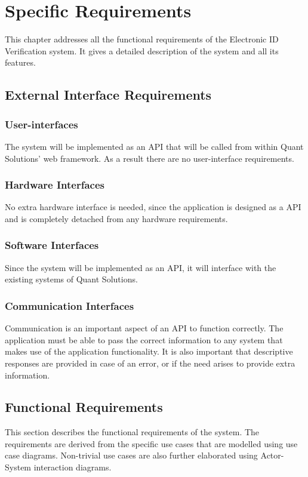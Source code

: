 \documentclass{article}
\def \project{Electronic ID Verification }
\begin{document}
	\cleardoublepage

	\section{Specific Requirements}\label{sec:specific-requirements}
		This chapter addresses all the functional requirements of the \project system. It gives a detailed description of the system and all its features.

		\subsection{External Interface Requirements}\label{subsec:specific-external}
		\subsubsection{User-interfaces}
		The system will be implemented as an API that will be called from within Quant Solutions' web framework. As a result there are no user-interface requirements.
		\subsubsection{Hardware Interfaces}
		No extra hardware interface is needed, since the application is designed as a API and is completely detached from any hardware requirements.
		\subsubsection{Software Interfaces}
		Since the system will be implemented as an API, it will interface with the existing systems of Quant Solutions. 
		\subsubsection{Communication Interfaces}
		Communication is an important aspect of an API to function correctly. The application must be able to pass the correct information to any system that makes use of the application functionality. It is also important that descriptive responses are provided in case of an error, or if the need arises to provide extra information.\\
			

		\subsection{Functional Requirements}\label{subsec:specific-functional}
		This section describes the functional requirements of the system. The requirements are derived from the specific use cases that are modelled using use case diagrams. Non-trivial use cases are also further elaborated using Actor-System interaction diagrams.
		
\end{document}

